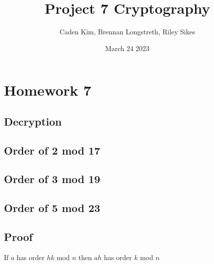 \documentclass{article}
\title{Project 7 Cryptography}
\author{Caden Kim, Brennan Longstreth, Riley Sikes }
\date{March 24 2023}
\begin{document}
\maketitle

\section{Homework 7}

\subsection{Decryption}

\subsection{Order of 2 mod 17}

\subsection{Order of 3 mod 19}

\subsection{Order of 5 mod 23}

\subsection{Proof}
If $a$ has order $hk$ mod $n$ then $ah$ has order $k$ mod $n$
\end{document}
